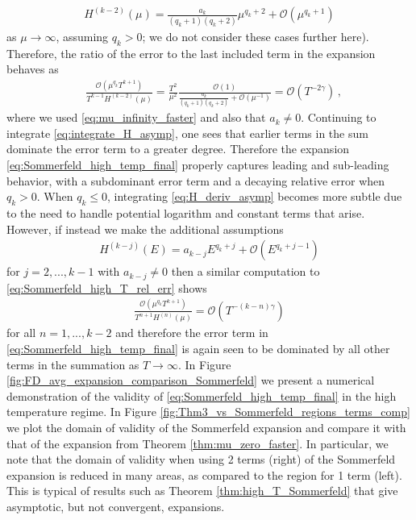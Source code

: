 \documentclass[sn-mathphys,Numbered]{sn-jnl}
\begin{document}
\begin{align}\label{eq:integrate_H_asymp}
    H^{(k-2)}(\mu)=\frac{a_k}{(q_k+1)(q_k+2)}\mu^{q_k+2}+\mathcal{O}(\mu^{q_k+1})
\end{align}
as $\mu\to\infty$, assuming $q_k>0$; we do not consider these cases further here). Therefore, the ratio of the error to the last included term in the expansion behaves as
\begin{align}\label{eq:Sommerfeld_high_T_rel_err}
&\frac{\mathcal{O}(\mu^{q_k}T^{k+1})}{ T^{k-1} H^{(k-2)}(\mu)}=\frac{T^2}{\mu^2}\frac{\mathcal{O}(1)}{ \frac{a_k}{(q_k+1)(q_k+2)}+\mathcal{O}(\mu^{-1})}= \mathcal{O}(T^{-2\gamma})\,,
\end{align}
where we used \eqref{eq:mu_infinity_faster} and also that $a_k\neq 0$. Continuing to integrate \eqref{eq:integrate_H_asymp}, one sees that earlier terms in the sum dominate the error term to a  greater degree.  Therefore the expansion \eqref{eq:Sommerfeld_high_temp_final} properly  captures leading and sub-leading behavior, with a subdominant error term and a decaying relative error when $q_k>0$. When $q_k\leq 0$, integrating \eqref{eq:H_deriv_asymp} becomes more subtle due to the need to handle potential logarithm and constant terms that arise.  However, if instead we make the additional assumptions 
\begin{align}
H^{(k-j)}(E)=a_{k-j} E^{q_k+j} +\mathcal{O}(E^{q_k+j-1})
\end{align}
for $j=2,...,k-1$ with $a_{k-j}\neq 0$ then a similar computation to \eqref{eq:Sommerfeld_high_T_rel_err} shows
\begin{align}
    \frac{\mathcal{O}(\mu^{q_k}T^{k+1})}{T^{n+1}H^{(n)}(\mu)}= \mathcal{O}(T^{-(k-n)\gamma})
\end{align}
for all $n=1,...,k-2$ and therefore the error term in \eqref{eq:Sommerfeld_high_temp_final} is again seen to be dominated by all other terms in the summation as $T\to\infty$. In Figure \ref{fig:FD_avg_expansion_comparison_Sommerfeld} we present a  numerical demonstration of the validity of \eqref{eq:Sommerfeld_high_temp_final} in the high temperature regime. In   Figure \ref{fig:Thm3_vs_Sommerfeld_regions_terms_comp} we plot the domain of validity of the  Sommerfeld expansion  and compare it with that of the expansion from Theorem \ref{thm:mu_zero_faster}.  In particular, we note that the domain of validity when using 2 terms (right) of the Sommerfeld expansion is reduced in many areas, as compared to the region for 1 term (left). This is typical of results such as Theorem \ref{thm:high_T_Sommerfeld} that give asymptotic, but not convergent, expansions.
\end{document}

